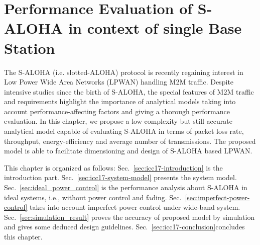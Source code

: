 \chapter{Performance Evaluation of S-ALOHA in context of single Base Station}
\label{chapter:icc17}
\ifpdf
    \graphicspath{{Chapter4/Figs/Raster/}{Chapter4/Figs/PDF/}{Chapter4/Figs/}}
\else
    \graphicspath{{Chapter4/Figs/Vector/}{Chapter4/Figs/}}
\fi
{}
The S-ALOHA (i.e. slotted-ALOHA) protocol is recently regaining interest in Low Power Wide Area Networks (LPWAN) handling M2M traffic. Despite intensive studies since the birth of S-ALOHA, the special features of M2M traffic and requirements highlight the importance of analytical models taking into account performance-affecting factors and giving a thorough performance evaluation. In this chapter, we propose a low-complexity but still accurate analytical model capable of evaluating S-ALOHA in terms of packet loss rate, throughput, energy-efficiency and average number of transmissions. The proposed model is able to facilitate dimensioning and design of S-ALOHA based LPWAN. 

This chapter is organized as follows: Sec.~\ref{sec:icc17-introduction} is the introduction part. Sec.~\ref{sec:icc17-system-model} presents the system model. Sec.~\ref{sec:ideal_power_control} is the performance analysis about S-ALOHA in ideal systems, i.e., without power control and fading. Sec.~\ref{sec:imperfect-power-control} takes into account imperfect power control under wide-band system. Sec.~\ref{sec:simulation_result} proves the accuracy of proposed model by simulation and gives some deduced design guidelines. Sec.~\ref{sec:icc17-conclusion}concludes this chapter.





 







